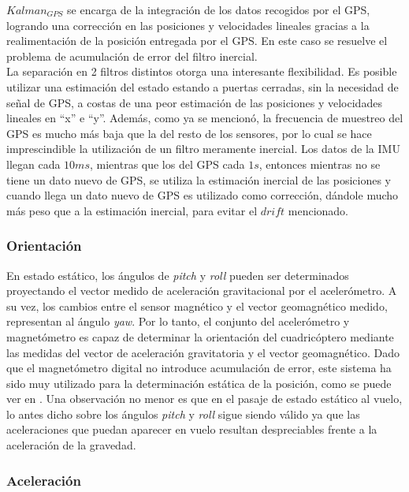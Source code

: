 \documentclass[main]{subfiles}
\begin{document}
$Kalman_{GPS}$ se encarga de la integración de los datos recogidos por el GPS, logrando una corrección en las posiciones y velocidades lineales gracias a la realimentación de la posición entregada por el GPS. En este caso se resuelve el problema de acumulación de error del filtro inercial.\\

La separación en 2 filtros distintos otorga una interesante flexibilidad. Es posible utilizar una estimación del estado estando a puertas cerradas, sin la necesidad de señal de GPS, a costas de una peor estimación de las posiciones y velocidades lineales en ``x'' e ``y''. Además, como ya se mencionó, la frecuencia de muestreo del GPS es mucho más baja que la del resto de los sensores, por lo cual se hace imprescindible la utilización de un filtro meramente inercial. Los datos de la IMU llegan cada $10ms$, mientras que los del GPS cada $1s$, entonces mientras no se tiene un dato nuevo de GPS, se utiliza la estimación inercial de las posiciones y cuando llega un dato nuevo de GPS es utilizado como corrección, dándole mucho más peso que a la estimación inercial, para evitar el $drift$ mencionado.

\subsubsection*{Orientación}

En estado estático, los ángulos de \emph{pitch} y \emph{roll} pueden ser determinados proyectando el vector medido de aceleración gravitacional por el acelerómetro. A su vez, los cambios entre el sensor magnético y el vector geomagnético medido, representan al ángulo \emph{yaw}. Por lo tanto, el conjunto del acelerómetro y magnetómetro es capaz de determinar la orientación del cuadricóptero mediante las medidas del vector de aceleración gravitatoria y el vector geomagnético. Dado que el magnetómetro digital no introduce acumulación de error, este sistema ha sido muy utilizado para la determinación estática de la posición, como se puede ver en \cite{bib:euler_magneto_acc}. Una observación no menor es que en el pasaje de estado estático al vuelo, lo antes dicho sobre los ángulos \emph{pitch} y \emph{roll} sigue siendo válido ya que las aceleraciones que puedan aparecer en vuelo resultan despreciables frente a la aceleración de la gravedad.

\subsubsection{Aceleración}
\end{document}
